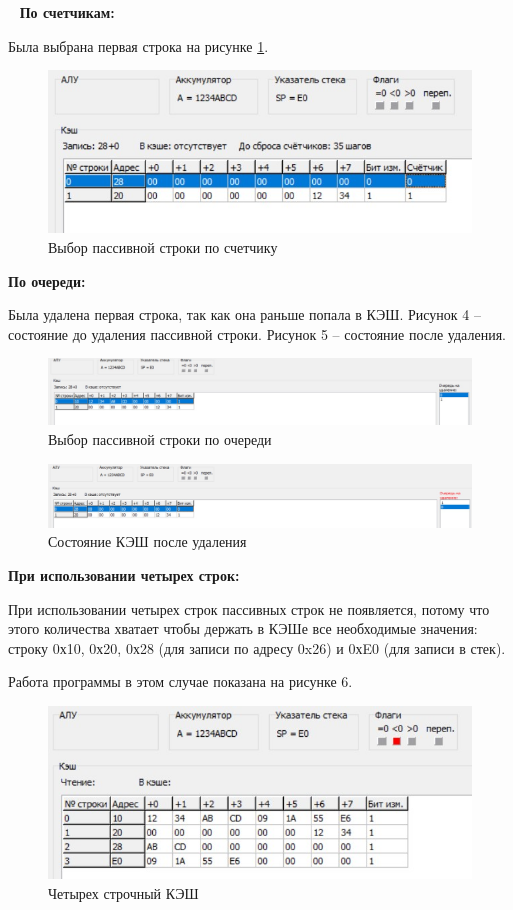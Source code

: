 \documentclass[a4paper,14pt]{extarticle}
\begin{document}
\begin{problem*}{~}
\textbf{По счетчикам:}

Была выбрана первая строка на рисунке \ref{fig:lab4-three}.

\begin{figure}[h!]
	\centering
	\includegraphics[width=0.6\linewidth]{images/lab4-three}
	\caption{Выбор пассивной строки по счетчику}
	\label{fig:lab4-three}
\end{figure}

\textbf{По очереди:}

Была удалена первая строка, так как она раньше попала в КЭШ. Рисунок 4 – состояние до удаления пассивной строки. Рисунок 5 – состояние после удаления.

\begin{figure}[h!]
	\centering
	\includegraphics[width=0.6\linewidth]{images/lab4-four}
	\caption{Выбор пассивной строки по очереди}
	\label{fig:lab4-four}
	
\end{figure}

\begin{figure}[h!]	\centering
	\includegraphics[width=0.6\linewidth]{images/lab4-four1}
	\caption{Состояние КЭШ после удаления}
	\label{fig:lab4-four1}
\end{figure}


\textbf{При использовании четырех строк:}

При использовании четырех строк пассивных строк не появляется, потому что этого количества хватает чтобы держать в КЭШе все необходимые значения: строку 0х10, 0х20, 0х28 (для записи по адресу 0x26) и 0хE0 (для записи в стек). 

Работа программы в этом случае показана на рисунке 6.

\begin{figure}[h!]
	\centering
	\includegraphics[width=0.6\linewidth]{images/lab4-6}
	\caption{Четырех строчный КЭШ}
	\label{fig:lab4-6}
\end{figure}

\newpage	
\end{problem*}
\end{document}
